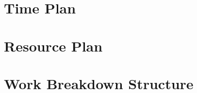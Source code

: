 \documentclass[11pt, titlepage]{article} %
\begin{document}
\clearpage



\clearpage
\appendix
\section{Time Plan}
\section{Resource Plan}
\section{Work Breakdown Structure}
\end{document}
